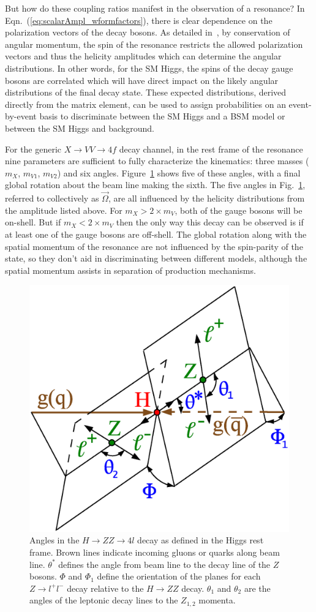 But how do these coupling ratios manifest in the observation of a resonance? In Eqn.~(\ref{eq:scalarAmpl_wformfactors}), there is clear dependence on the polarization vectors of the decay bosons. As detailed in~\cite{}, by conservation of angular momentum, the spin of the resonance restricts the allowed polarization vectors and thus the helicity amplitudes which can determine the angular distributions. In other words, for the SM Higgs, the spins of the decay gauge bosons are correlated which will have direct impact on the likely angular distributions of the final decay state. These expected distributions, derived directly from the matrix element, can be used to assign probabilities on an event-by-event basis to discriminate between the SM Higgs and a BSM model or between the SM Higgs and background.

For the generic $X\rightarrow VV \rightarrow 4f$ decay channel, in the rest frame of the resonance nine parameters are sufficient to fully characterize the kinematics: three masses ($m_X$, $m_{V1}$, $m_{V2}$) and six angles. Figure~\ref{fig:HVVAngles} shows five of these angles, with a final global rotation about the beam line making the sixth. The five angles in Fig.~\ref{fig:HVVAngles}, referred to collectively as $\vec{\Omega}$, are all influenced by the helicity distributions from the amplitude listed above. For $m_X > 2\times m_V$, both of the gauge bosons will be on-shell. But if $m_X < 2\times m_V$ then the only way this decay can be observed is if at least one of the gauge bosons are off-shell. The global rotation along with the spatial momentum of the resonance are not influenced by the spin-parity of the state, so they don't aid in discriminating between different models, although the spatial momentum assists in separation of production mechanisms.

\begin{figure}[htbp]
\begin{center}
\includegraphics[width=.5\linewidth]{Phenomenology/figures/angles-HZZ4l.eps}
\caption[Definition of Angles in $H\rightarrow VV$ Decay]{Angles in the $H\rightarrow ZZ \rightarrow 4l$ decay as defined in the Higgs rest frame. Brown lines indicate incoming gluons or quarks along beam line. $\theta^*$ defines the angle from beam line to the decay line of the $Z$ bosons. $\Phi$ and $\Phi_1$ define the orientation of the planes for each $Z\rightarrow l^+l^-$ decay relative to the $H \rightarrow ZZ$ decay. $\theta_1$ and $\theta_2$ are the angles of the leptonic decay lines to the $Z_{1,2}$ momenta.}
\label{fig:HVVAngles}
\end{center}
\end{figure}


